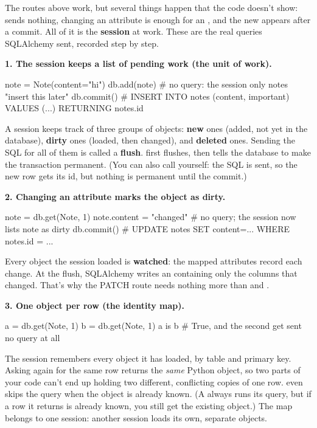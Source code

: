 The routes above work, but several things happen that the code doesn't show:  sends nothing, changing an attribute is enough for an , and the new  appears after a commit. All of it is the \textbf{session} at work. These are the real queries SQLAlchemy sent, recorded step by step.

\textbf{1. The session keeps a list of pending work (the unit of work).}

\begin{py}
note = Note(content="hi")
db.add(note)        # no query: the session only notes "insert this later"
db.commit()         # INSERT INTO notes (content, important) VALUES (...) RETURNING notes.id
\end{py}

A session keeps track of three groups of objects: \textbf{new} ones (added, not yet in the database), \textbf{dirty} ones (loaded, then changed), and \textbf{deleted} ones. Sending the SQL for all of them is called a \textbf{flush}.  first flushes, then tells the database to make the transaction permanent. (You can also call  yourself: the SQL is sent, so the new row gets its id, but nothing is permanent until the commit.)

\textbf{2. Changing an attribute marks the object as dirty.}

\begin{py}
note = db.get(Note, 1)
note.content = "changed"    # no query; the session now lists note as dirty
db.commit()                 # UPDATE notes SET content=... WHERE notes.id = ...
\end{py}

Every object the session loaded is \textbf{watched}: the mapped attributes record each change. At the flush, SQLAlchemy writes an  containing only the columns that changed. That's why the PATCH route needs nothing more than  and .

\textbf{3. One object per row (the identity map).}

\begin{py}
a = db.get(Note, 1)
b = db.get(Note, 1)
a is b                       # True, and the second get sent no query at all
\end{py}

The session remembers every object it has loaded, by table and primary key. Asking again for the same row returns the \emph{same} Python object, so two parts of your code can't end up holding two different, conflicting copies of one row.  even skips the query when the object is already known. (A  always runs its query, but if a row it returns is already known, you still get the existing object.) The map belongs to one session: another session loads its own, separate objects.

